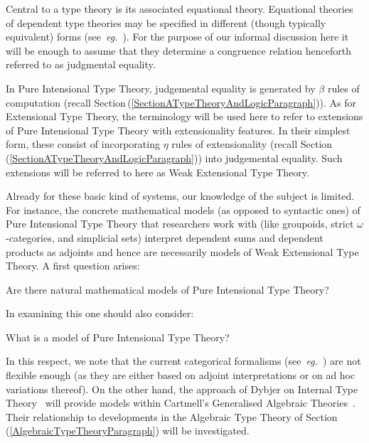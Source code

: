 \documentclass[11pt,twocolumn]{article}
\newcounter{CC}
\newenvironment{resenumerate}
  {\begin{list}{[\textbf{\arabic{CC}]}}
  {\usecounter{CC}
   \setlength{\topsep}{2pt}
   \setlength{\partopsep}{2pt}
   \setlength{\itemsep}{2.5pt}
   \setlength{\parsep}{2.5pt}
   \setlength{\leftmargin}{1.65em}
   \setlength{\labelwidth}{1.15em}
 }}
  {\end{list}}
\newcommand{\pref}[1]{\,(\ref{#1})}
\newcommand{\eg}{\emph{eg.}}
\begin{document}
Central to a type theory is its associated equational theory.  Equational
theories of dependent type theories may be specified in different (though
typically equivalent) forms (see~\eg~\cite{Adams}).  For the purpose of our
informal discussion here it will be enough to assume that they determine a
congruence relation
henceforth referred to as judgmental equality.

In Pure Intensional Type Theory, judgemental equality is generated by $\beta$
rules of computation (recall
Section\pref{SectionATypeTheoryAndLogicParagraph}).
%
As for Extensional Type Theory, the terminology will be used here to refer to
extensions of Pure Intensional Type Theory with extensionality features.  In
their simplest form, these consist of incorporating $\eta$ rules
of extensionality (recall Section\pref{SectionATypeTheoryAndLogicParagraph})
into judgemental equality.  Such extensions will be referred to here as Weak
Extensional Type Theory.

Already for these basic kind of systems, 
our knowledge of the subject is limited. %
%
For instance, %
the concrete mathematical models (as opposed to syntactic ones) of Pure
Intensional Type Theory 
that researchers work with (like groupoids, strict $\omega$-categories, and
simplicial sets) interpret dependent sums and dependent products as adjoints
and hence are necessarily models of Weak Extensional Type Theory.  A first
question arises:
\begin{resenumerate}\setcounter{CC}{1}
\item 
  Are there natural mathematical models of Pure Intensional Type Theory?
\end{resenumerate}
In examining this one should also consider:
\begin{resenumerate}\setcounter{CC}{2}
\item 
  What is a model of Pure Intensional Type Theory?
\end{resenumerate}
In this respect, we note that the current categorical formalisms
(see~\eg~\cite{Jacobs}) are not flexible enough (as they are either based on
adjoint interpretations or on ad hoc variations thereof).  On the other hand,
the approach of Dybjer on Internal Type Theory~\cite{DybjerITT} will provide
models within Cartmell's Generalised Algebraic Theories~\cite{Cartmell}.
Their relationship to developments in the Algebraic Type Theory of
Section\pref{AlgebraicTypeTheoryParagraph} will be investigated.
\end{document}
